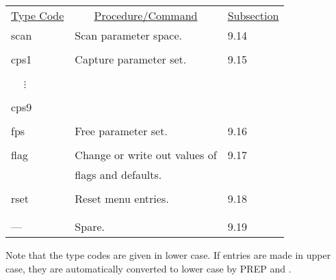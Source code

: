 \begin{center}
\begin{tabular}{lll}
\multicolumn{1}{c}{\underline {Type Code}} &
\multicolumn{1}{c}{\underline{Procedure/Command}}   &
\multicolumn{1}{c}{\underline{Subsection}} \\
\hspace{1.5em}scan    &    Scan parameter space. & \hspace{2em}9.14\\
\vspace{-3mm}& &\\
\hspace{1.5em}cps1   &  Capture parameter set.               &      \hspace{2em}9.15\\
\vspace{-7mm}& &\\
\hspace{1.5em}\ \ \,$\vdots$ & &\\
\vspace{-7mm}& &\\
\hspace{1.5em}cps9 \\
\vspace{-3mm}& &\\
\hspace{1.5em}fps     &    Free parameter set.           &     \hspace{2em}9.16\\
\vspace{-3mm}& &\\
\hspace{1.5em}flag    &    Change or write out values of   & \hspace{2em}9.17\\
           &   flags and defaults. &\\
 \vspace{-3mm}& &\\
 \hspace{1.5em}rset    &    Reset menu entries.         &          \hspace{2em}9.18\\
\vspace{-3mm}& &\\
\vspace{-3mm}& &\\
\hspace{1.5em}---     &    Spare.         &     \hspace{2em}9.19\\
\end{tabular}
\end{center}
Note that the type codes are given in lower case.  If entries are made in
upper case, they are automatically converted to lower case by PREP and
\Maryend.

